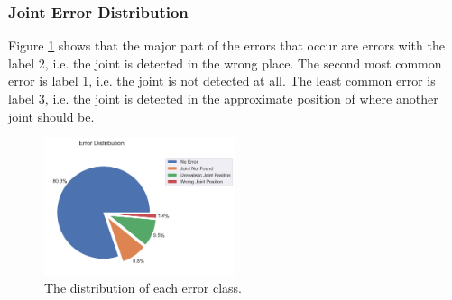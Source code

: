 \subsubsection{Joint Error Distribution}

Figure \ref{fig:jt_pie} shows that the major part of the errors that occur are errors with the label 2, i.e. the joint is detected in the wrong place. The second most common error is label 1, i.e. the joint is not detected at all. The least common error is label 3, i.e. the joint is detected in the approximate position of where another joint should be.

\begin{figure}[ht]
  \centering
  \includegraphics[width=0.5\textwidth]{figures/Data/dist_joints/Error_Distribution.png}
  \caption[Error Distribution for each error class]{The distribution of each error class.}
  \label{fig:jt_pie}
\end{figure}

